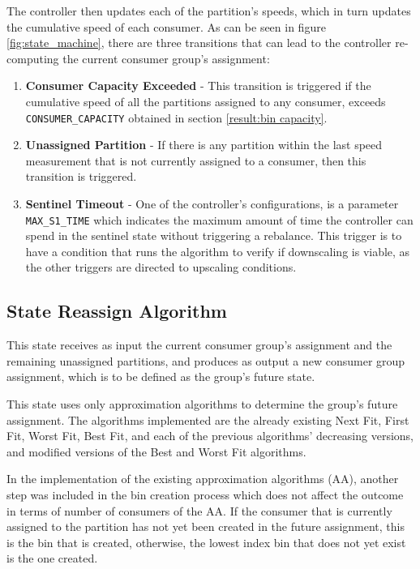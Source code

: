 The controller then updates each of the partition's speeds, which in turn
updates the cumulative speed of each consumer. As can be seen in figure
\ref{fig:state_machine}, there are three transitions that can lead to the
controller re-computing the current consumer group's assignment:
\begin{enumerate} 
    \item \textbf{Consumer Capacity Exceeded} - This transition is triggered if
        the cumulative speed of all the partitions assigned to any consumer,
        exceeds \lstinline{CONSUMER_CAPACITY} obtained in section
        \ref{result:bin capacity}.  
    \item \textbf{Unassigned Partition} - If there is any partition within the
        last speed measurement that is not currently assigned to a consumer,
        then this transition is triggered.  
    \item \textbf{Sentinel Timeout} - One of the controller's configurations, is
        a parameter \lstinline{MAX_S1_TIME} which indicates the
        maximum amount of time the controller can spend in the sentinel state
        without triggering a rebalance. This trigger is to have a condition that
        runs the algorithm to verify if downscaling is viable, as the other
        triggers are directed to upscaling conditions.
\end{enumerate}

\subsection{State Reassign Algorithm}

This state receives as input the current consumer group's assignment and the
remaining unassigned partitions, and produces as output a new consumer group
assignment, which is to be defined as the group's future state.

This state uses only approximation algorithms to determine the group's future
assignment. The algorithms implemented are the already existing Next Fit, First
Fit, Worst Fit, Best Fit, and each of the previous algorithms' decreasing
versions, and modified versions of the Best and Worst Fit algorithms. 

In the implementation of the existing approximation algorithms (AA), another step was
included in the bin creation process which does not affect the outcome in terms
of number of consumers of the AA. If the consumer that is currently assigned to
the partition has not yet been created in the future assignment, this is the bin
that is created, otherwise, the lowest index bin that does not yet exist is the
one created.

